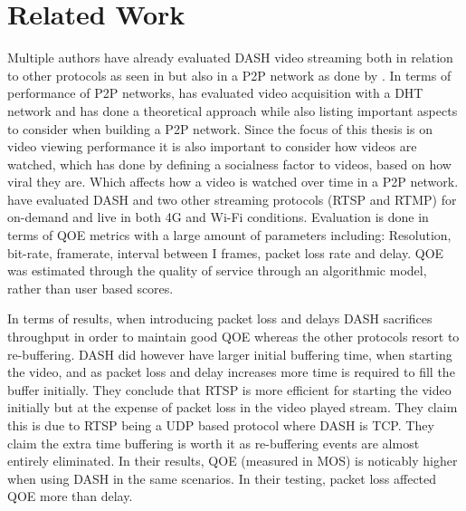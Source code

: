 \chapter{Related Work}
\label{cha:related-work}

Multiple authors have already evaluated \ac{DASH} video streaming both in relation to other protocols as seen in \citet{aloman2015performance} but also in a \ac{P2P} network as done by \citet{gazdar2017toward}. In terms of performance of \ac{P2P} networks, \citet{nguyen2009p2p} has evaluated video acquisition with a \ac{DHT} network and \citet{qiu2004modeling} has done a theoretical approach while also listing important aspects to consider when building a \ac{P2P} network. Since the focus of this thesis is on video viewing performance it is also important to consider how videos are watched, which \citet{broxton2013catching} has done by defining a socialness factor to videos, based on how viral they are. Which affects how a video is watched over time in a \ac{P2P} network.
\\


\citet{aloman2015performance} have evaluated \ac{DASH} and two other streaming protocols (\ac{RTSP} and \ac{RTMP}) for on-demand and live in both 4G and Wi-Fi conditions. Evaluation is done in terms of \ac{QOE} metrics with a large amount of parameters including: Resolution, bit-rate, framerate, interval between I frames, packet loss rate and delay. \ac{QOE} was estimated through the quality of service through an algorithmic model, rather than user based scores.

In terms of results, when introducing packet loss and delays \ac{DASH} sacrifices throughput in order to maintain good \ac{QOE} whereas the other protocols resort to re-buffering. \ac{DASH} did however have larger initial buffering time, when starting the video, and as packet loss and delay increases more time is required to fill the buffer initially. They conclude that \ac{RTSP} is more efficient for starting the video initially but at the expense of packet loss in the video played stream. They claim this is due to \ac{RTSP} being a \ac{UDP} based protocol where \ac{DASH} is \ac{TCP}. They claim the extra time buffering is worth it as re-buffering events are almost entirely eliminated. In their results, \ac{QOE} (measured in \ac{MOS}) is noticably higher when using \ac{DASH} in the same scenarios. In their testing, packet loss affected \ac{QOE} more than delay.
\\


